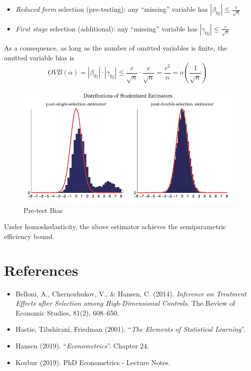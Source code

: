\documentclass[12pt,]{book}
\providecommand{\tightlist}{%
  \setlength{\itemsep}{0pt}\setlength{\parskip}{0pt}}
\begin{document}
\begin{itemize}
\tightlist
\item
  \emph{Reduced form} selection (pre-testing): any ``missing'' variable has \(|\beta_{0j}| \leq \frac{c}{\sqrt{n}}\)
\item
  \emph{First stage} selection (additional): any ``missing'' variable has \(|\gamma_{0j}| \leq \frac{c}{\sqrt{n}}\)
\end{itemize}

As a consequence, as long as the number of omitted variables is finite, the omitted variable bias is
\[
    OVB(\alpha) = |\beta_{0j}| \cdot|\gamma_{0j}| \leq \frac{c}{\sqrt{n}} \cdot \frac{c}{\sqrt{n}} = \frac{c^2}{n} = o \left(\frac{1}{\sqrt{n}}\right)
\]

\begin{figure}
\centering
\includegraphics{figures/Fig_641.png}
\caption{Pre-test Bias}
\end{figure}

Under homoskedasticity, the above estimator achieves the semiparametric efficiency bound.

\hypertarget{references-8}{%
\section{References}\label{references-8}}

\begin{itemize}
\tightlist
\item
  Belloni, A., Chernozhukov, V., \& Hansen, C. (2014). \emph{Inference on Treatment Effects after Selection among High-Dimensional Controls}. The Review of Economic Studies, 81(2), 608--650.
\item
  Hastie, Tibshirani, Friedman (2001). ``\emph{The Elements of Statistical Learning}''.
\item
  Hansen (2019). ``\emph{Econometrics}''. Chapter 24.
\item
  Kozbur (2019). PhD Econometrics - Lecture Notes.
\end{itemize}
\end{document}
